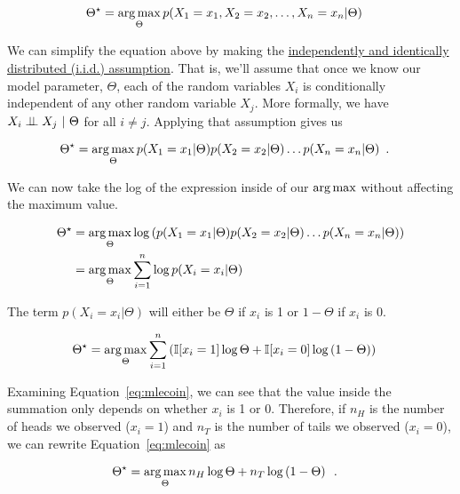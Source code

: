 \documentclass{tufte-handout}
\begin{document}
\begin{align}
\Theta^\star &= \operatorname*{arg\,max}_{\Theta} p(X_1 = x_1, X_2 = x_2, \ldots, X_n = x_n | \Theta)
\end{align} 

We can simplify the equation above by making the \href{https://en.wikipedia.org/wiki/Independent_and_identically_distributed_random_variables}{independently and identically distributed (i.i.d.) assumption}.  That is, we'll assume that once we know our model parameter, $\Theta$, each of the random variables $X_i$ is conditionally independent of any other random variable $X_j$.  More formally, we have $X_i \perp\!\!\!\perp X_j~|~\Theta$ for all $i \neq j$.  Applying that assumption gives us

\begin{align}
\Theta^\star &= \operatorname*{arg\,max}_{\Theta} p(X_1 = x_1 | \Theta) p(X_2 = x_2 | \Theta) \ldots p(X_n = x_n | \Theta) \enspace .
\end{align}

We can now take the log of the expression inside of our $\operatorname*{arg\,max}$ without affecting the maximum value.


\begin{align}
\Theta^\star &= \operatorname*{arg\,max}_{\Theta} \log \left ( p(X_1 = x_1 | \Theta) p(X_2 = x_2 | \Theta) \ldots p(X_n = x_n | \Theta) \right) \nonumber \\
&= \operatorname*{arg\,max}_{\Theta} \sum_{i=1}^n \log  p(X_i = x_i | \Theta)
\end{align}

The term $p(X_i = x_i | \Theta)$ will either be $\Theta$ if $x_i$ is 1 or $1-\Theta$ if $x_i$ is 0.

\begin{align}
\Theta^\star &= \operatorname*{arg\,max}_{\Theta} \sum_{i=1}^n \left ( \mathbb{I} [ x_i =1] \log \Theta  + \mathbb{I}[x_i = 0]  \log\left (1-  \Theta \right) \right) \label{eq:mlecoin}
\end{align}

Examining Equation~\ref{eq:mlecoin}, we can see that the value inside the summation only depends on whether $x_i$ is 1 or 0.  Therefore, if $n_{H}$ is the number of heads we observed ($x_i = 1$) and $n_{T}$ is the number of tails we observed ($x_i = 0$), we can rewrite Equation~\ref{eq:mlecoin} as


\begin{align}
\Theta^\star &= \operatorname*{arg\,max}_{\Theta} n_H \log \Theta  + n_T  \log\left (1-  \Theta \right) \label{eq:mlecoincount} \enspace .
\end{align}
\end{document}
